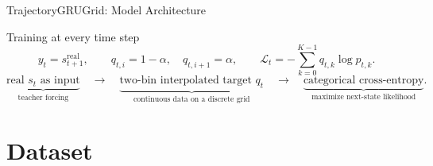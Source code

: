 \documentclass[aspectratio=169]{beamer}
\begin{document}
\begin{frame}{TrajectoryGRUGrid: Model Architecture}
{
}

\vspace{0.35cm}

\begin{block}{Training at every time step}
\small
\[
  y_t=s_{t+1}^{\mathrm{real}},
  \qquad
  q_{t,i}=1-\alpha,\quad q_{t,i+1}=\alpha,
  \qquad
  \mathcal{L}_t
  =-\sum_{k=0}^{K-1}q_{t,k}\log p_{t,k}.
\]
\vspace{-2mm}
\[
  \underbrace{\text{real }s_t\text{ as input}}_{\text{teacher forcing}}
  \quad\longrightarrow\quad
  \underbrace{\text{two-bin interpolated target }q_t}_{\text{continuous data on a discrete grid}}
  \quad\longrightarrow\quad
  \underbrace{\text{categorical cross-entropy}}_{\text{maximize next-state likelihood}} .
\]
\end{block}
\end{frame}

\section{Dataset}
\end{document}
